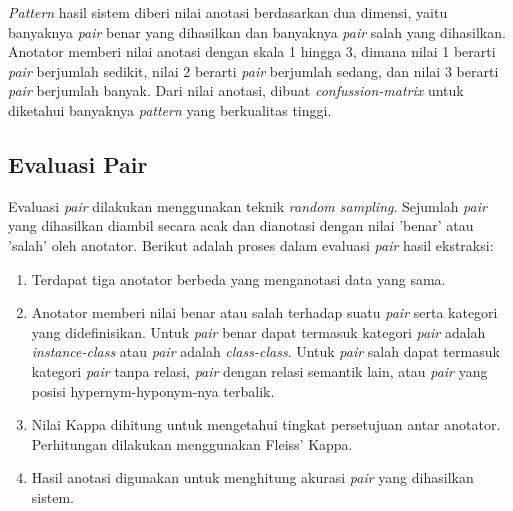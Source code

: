 \textit{Pattern} hasil sistem diberi nilai anotasi berdasarkan dua dimensi, yaitu banyaknya \textit{pair} benar yang dihasilkan dan banyaknya \textit{pair} salah yang dihasilkan. Anotator memberi nilai anotasi dengan skala 1 hingga 3, dimana nilai 1 berarti \textit{pair} berjumlah sedikit, nilai 2 berarti \textit{pair} berjumlah sedang, dan nilai 3 berarti \textit{pair} berjumlah banyak. Dari nilai anotasi, dibuat \textit{confussion-matrix} untuk diketahui banyaknya \textit{pattern} yang berkualitas tinggi. 

\subsection{Evaluasi Pair}
Evaluasi \textit{pair} dilakukan menggunakan teknik \textit{random sampling}. Sejumlah \textit{pair} yang dihasilkan diambil secara acak dan dianotasi dengan nilai 'benar' atau 'salah' oleh anotator. Berikut adalah proses dalam evaluasi \textit{pair} hasil ekstraksi:
\begin{enumerate}
  \item Terdapat tiga anotator berbeda yang menganotasi data yang sama. 
  \item Anotator memberi nilai benar atau salah terhadap suatu \textit{pair} serta kategori yang didefinisikan. Untuk \textit{pair} benar dapat termasuk kategori \textit{pair} adalah \textit{instance-class} atau \textit{pair} adalah \textit{class-class}. Untuk \textit{pair} salah dapat termasuk kategori \textit{pair} tanpa relasi, \textit{pair} dengan relasi semantik lain, atau \textit{pair} yang posisi hypernym-hyponym-nya terbalik. 
  \item Nilai Kappa dihitung untuk mengetahui tingkat persetujuan antar anotator. Perhitungan dilakukan menggunakan Fleiss' Kappa.
  \item Hasil anotasi digunakan untuk menghitung akurasi \textit{pair} yang dihasilkan sistem.
\end{enumerate}

